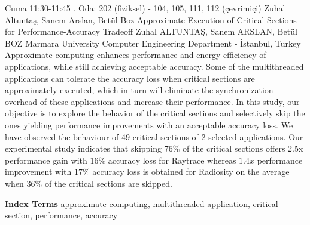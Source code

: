 
    \begin{abstract_basarim}
    {Cuma 11:30-11:45}
    {.}
    {Oda: 202 (fiziksel) - 104, 105, 111, 112 (çevrimiçi)}
    {Zuhal Altuntaş, Sanem Arslan, Betül Boz}
    {Approximate Execution of Critical Sections for Performance-Accuracy Tradeoff}
    {%
    Zuhal ALTUNTAŞ, Sanem ARSLAN, Betül BOZ}
    {%
    }
    {%
    Marmara University Computer Engineering Department - İstanbul, Turkey}
    Approximate computing enhances performance and energy efficiency of applications, while still achieving acceptable accuracy. Some of the multithreaded applications can tolerate the accuracy loss when critical sections are approximately executed, which in turn will eliminate the synchronization overhead of these applications and increase their performance. In this study, our objective is to explore the behavior of the critical sections and selectively skip the ones yielding performance improvements with an acceptable accuracy loss. We have observed the behaviour of 49 critical sections of 2 selected applications. Our experimental study indicates that skipping $76 \%$ of the critical sections offers 2.5x performance gain with $16 \%$ accuracy loss for Raytrace whereas $1.4 x$ performance improvement with $17 \%$ accuracy loss is obtained for Radiosity on the average when $36 \%$ of the critical sections are skipped. 
    
            \textbf{Index Terms} \newline{}approximate computing, multithreaded application, critical section, performance, accuracy
    \end{abstract_basarim}
    